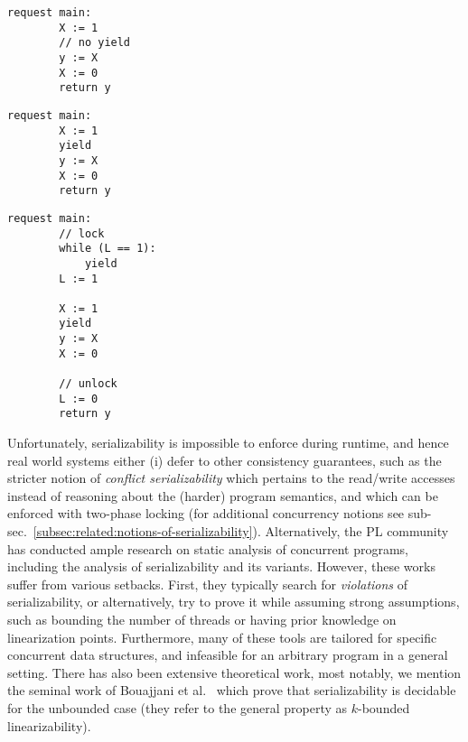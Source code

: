 \noindent
\begin{minipage}[t]{0.45\textwidth}
	\begin{minipage}[t]{\textwidth}
		\begin{lstlisting}[caption={Without yield or lock (serializable)},
			label={lst:MotivatingExample1Ser}]
    request main: 
        X := 1 
        // no yield
        y := X 
        X := 0
        return y 
		\end{lstlisting}
	\end{minipage}
	\vspace{1em}
	\begin{minipage}[t]{\textwidth}
		\begin{lstlisting}[caption={With yield (not serializable)},
			label={lst:MotivatingExample2NonSer}]
    request main: 
        X := 1 
        yield 
        y := X 
        X := 0
        return y 	
		\end{lstlisting}
	\end{minipage}
\end{minipage}%
\hfill
\begin{minipage}[t]{0.45\textwidth}
	\begin{lstlisting}[caption={With yield and lock (serializable)},
		label={lst:MotivatingExample3Ser}]
    request main: 
        // lock
        while (L == 1): 
            yield
        L := 1 

        X := 1
        yield
        y := X 
        X := 0

        // unlock    
        L := 0
        return y 
	\end{lstlisting}
\end{minipage}



Unfortunately, serializability is impossible to enforce during runtime, and hence real world systems either (i) defer to other consistency guarantees, such as the stricter notion of \textit{conflict serializability} which pertains to the read/write accesses instead of reasoning about the (harder) program semantics, and which can be enforced with two-phase locking (for additional concurrency notions see sub-sec.~\ref{subsec:related:notions-of-serializability}). Alternatively, the PL community has conducted ample research on static analysis of concurrent programs, including the analysis of serializability and its variants. However, these works suffer from various setbacks. First, they typically search for \textit{violations} of serializability, or alternatively, try to prove it while assuming strong assumptions, such as bounding the number of threads or having prior knowledge on linearization points.
Furthermore, many of these tools are tailored for specific concurrent data structures, and infeasible for an arbitrary program in a general setting.
%
There has also been extensive theoretical work, most notably, we mention the seminal work of Bouajjani et al.~\cite{BoEmEnHa13} which prove that serializability is decidable for the unbounded case (they refer to the general property as $k$-bounded linearizability).


